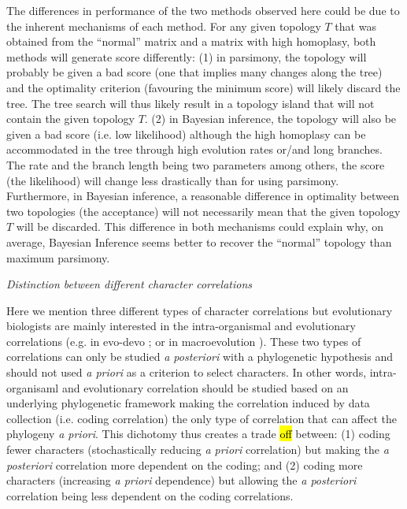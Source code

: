 \documentclass[12pt,letterpaper]{article}
\renewcommand{\subsection}[1]{%
\bigskip
\begin{center}
\begin{large}
\normalfont\itshape #1
\end{large}
\end{center}}
\begin{document}
The differences in performance of the two methods observed here could be due to the inherent mechanisms of each method.
For any given topology $T$ that was obtained from the ``normal'' matrix and a matrix with high homoplasy, both methods will generate score differently:
(1) in parsimony, the topology will probably be given a bad score (one that implies many changes along the tree) and the optimality criterion (favouring the minimum score) will likely discard the tree.
The tree search will thus likely result in a topology island that will not contain the given topology $T$.
(2) in Bayesian inference, the topology will also be given a bad score (i.e. low likelihood) although the high homoplasy can be accommodated in the tree through high evolution rates or/and long branches.
The rate and the branch length being two parameters among others, the score (the likelihood) will change less drastically than for using parsimony.
Furthermore, in Bayesian inference, a reasonable difference in optimality between two topologies (the acceptance) will not necessarily mean that the given topology $T$ will be discarded.
This difference in both mechanisms could explain why, on average, Bayesian Inference seems better to recover the ``normal'' topology than maximum parsimony.

\subsection{Distinction between different character correlations}
Here we mention three different types of character correlations but evolutionary biologists are mainly interested in the intra-organismal and evolutionary correlations (e.g. in evo-devo \citealt{goswami2006morphological}; or in macroevolution \citealt{fitzjohn2014much}).
These two types of correlations can only be studied \textit{a posteriori} with a phylogenetic hypothesis and should not used \textit{a priori} as a criterion to select characters.
In other words, intra-organisaml and evolutionary correlation should be studied based on an underlying phylogenetic framework making the correlation induced by data collection (i.e. coding correlation) the only type of correlation that can affect the phylogeny \textit{a priori}.
This dichotomy thus creates a trade \hl{off} between: (1) coding fewer characters (stochastically reducing \textit{a priori} correlation) but making the \textit{a posteriori} correlation more dependent on the coding;
and (2) coding more characters (increasing \textit{a priori} dependence) but allowing the \textit{a posteriori} correlation being less dependent on the coding correlations.
\end{document}
